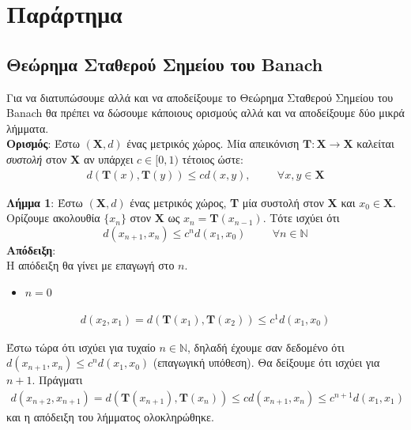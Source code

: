\documentclass[11pt]{article} %
\numberwithin{equation}{subsection}
\begin{document}
\newpage
 
\section{Παράρτημα}

\subsection{Θεώρημα Σταθερού Σημείου του Banach}
Για να διατυπώσουμε αλλά και να αποδείξουμε το Θεώρημα Σταθερού Σημείου του Banach θα πρέπει να δώσουμε κάποιους ορισμούς αλλά και να αποδείξουμε δύο μικρά λήμματα.\\

\textbf{Ορισμός}: Έστω $(\textbf{X}, d)$ ένας μετρικός χώρος. Μία απεικόνιση $\textbf{T}: \textbf{X} \rightarrow \textbf{X}$ καλείται \textit{συστολή} στον \textbf{X} αν υπάρχει $c \in [0, 1)$ τέτοιος ώστε:
\begin{align*}
d(\textbf{T}(x), \textbf{T}(y)) \leq c d(x, y), \hspace{1cm} \forall  x,y \in \textbf{X}
\end{align*}

\textbf{Λήμμα 1}: Έστω $(\textbf{X}, d)$ ένας μετρικός χώρος, \textbf{T} μία συστολή στον \textbf{X} και $x_{0} \in \textbf{X}$. Ορίζουμε ακολουθία $\{x_n\}$ στον \textbf{X} ως $x_{n} = \textbf{T}(x_{n-1})$. Τότε ισχύει ότι
\begin{equation}
d(x_{n+1}, x_{n}) \leq c^{n} d(x_{1}, x_{0}) \hspace{1cm} \forall n \in \mathbb{N}
\end{equation}
\textbf{Απόδειξη}:\\
Η απόδειξη θα γίνει με επαγωγή στο $n$. \\
\begin{itemize}
\item $n = 0$
\end{itemize}
\begin{align*}
d(x_{2}, x_{1})  = d(\textbf{T}(x_{1}), \textbf{T}(x_{2})) \leq c^{1} d(x_{1}, x_{0})
\end{align*}

Έστω τώρα ότι ισχύει για τυχαίο $n \in \mathbb{N}$, δηλαδή έχουμε σαν δεδομένο ότι $d(x_{n+1}, x_{n}) \leq c^{n} d(x_{1}, x_{0})$ (επαγωγική υπόθεση). Θα δείξουμε ότι ισχύει για $n+1$. Πράγματι
\begin{align*}
d(x_{n+2}, x_{n+1}) = d(\textbf{T}(x_{n+1}), \textbf{T}(x_{n})) \leq c d(x_{n+1}, x_{n}) \leq c^{n+1} d(x_{1}, x_{1})
\end{align*}
και η απόδειξη του λήμματος ολοκληρώθηκε.\\
\end{document}
